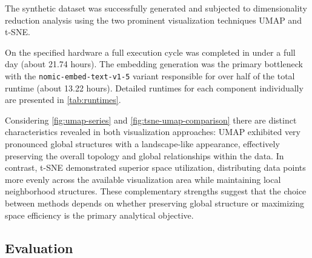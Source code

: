 The synthetic dataset was successfully generated and subjected to dimensionality reduction analysis using the two prominent visualization techniques UMAP and t-SNE.

\begin{table}[h!]
    \centering
    \caption{Runtimes for the pipeline components measured in seconds. The total runtime was measured across the full execution (excluding dataset loading times)}
    \label{tab:runtimes}
\end{table}

On the specified hardware a full execution cycle was completed in under a full day (about 21.74 hours). The embedding generation was the primary bottleneck with the \texttt{nomic-embed-text-v1-5} variant responsible for over half of the total runtime (about 13.22 hours). Detailed runtimes for each component individually are presented in \autoref{tab:runtimes}.

Considering \autoref{fig:umap-series} and \autoref{fig:tsne-umap-comparison} there are distinct characteristics revealed in both visualization approaches: UMAP exhibited very pronounced global structures with a landscape-like appearance, effectively preserving the overall topology and global relationships within the data. In contrast, t-SNE demonstrated superior space utilization, distributing data points more evenly across the available visualization area while maintaining local neighborhood structures. These complementary strengths suggest that the choice between methods depends on whether preserving global structure or maximizing space efficiency is the primary analytical objective.

\subsection{Evaluation}
\label{sec:eval}

